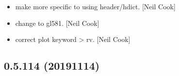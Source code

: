\documentclass[a4paper,10pt,english]{report}
\begin{document}
\begin{itemize}
\item {} 
 \sphinxhyphen{} make  more specific to using
header/hdict. {[}Neil Cook{]}

\item {} 
 \sphinxhyphen{} change to gl581. {[}Neil
Cook{]}

\item {} 
 \sphinxhyphen{} correct plot keyword  \textendash{}\textgreater{} rv.
{[}Neil Cook{]}

\end{itemize}


\subsection{0.5.114 (2019\sphinxhyphen{}11\sphinxhyphen{}14)}
\end{document}
